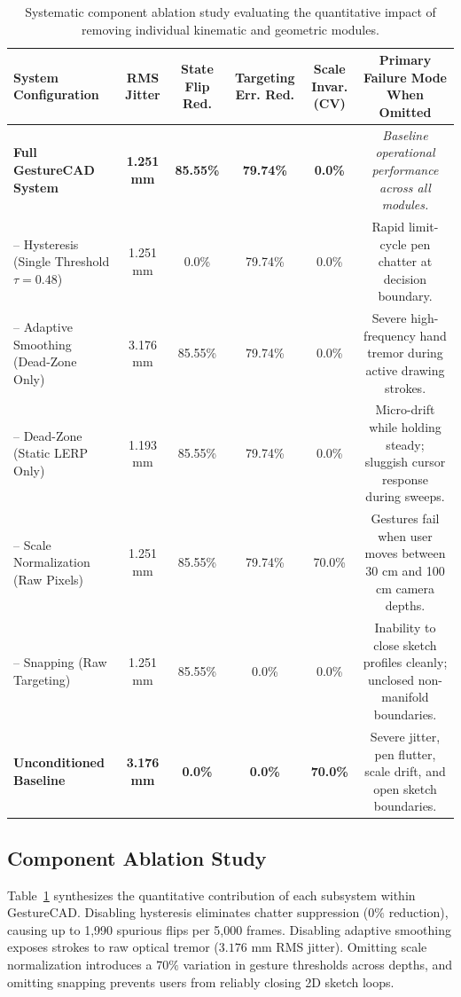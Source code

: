 \begin{table}[t]
\caption{Systematic component ablation study evaluating the quantitative impact of removing individual kinematic and geometric modules.}
\label{tab:ablation}
\centering
\small
\begin{tabular}{lccccc}
\toprule
\textbf{System Configuration} & \textbf{RMS Jitter} & \textbf{State Flip Red.} & \textbf{Targeting Err. Red.} & \textbf{Scale Invar. (CV)} & \textbf{Primary Failure Mode When Omitted} \\
\midrule
\textbf{Full GestureCAD System} & \textbf{1.251 mm} & \textbf{85.55\%} & \textbf{79.74\%} & \textbf{0.0\%} & \textit{Baseline operational performance across all modules.} \\
-- Hysteresis (Single Threshold $\tau=0.48$) & 1.251 mm & 0.0\% & 79.74\% & 0.0\% & Rapid limit-cycle pen chatter at decision boundary. \\
-- Adaptive Smoothing (Dead-Zone Only) & 3.176 mm & 85.55\% & 79.74\% & 0.0\% & Severe high-frequency hand tremor during active drawing strokes. \\
-- Dead-Zone (Static LERP Only) & 1.193 mm & 85.55\% & 79.74\% & 0.0\% & Micro-drift while holding steady; sluggish cursor response during sweeps. \\
-- Scale Normalization (Raw Pixels) & 1.251 mm & 85.55\% & 79.74\% & 70.0\% & Gestures fail when user moves between 30 cm and 100 cm camera depths. \\
-- Snapping (Raw Targeting) & 1.251 mm & 85.55\% & 0.0\% & 0.0\% & Inability to close sketch profiles cleanly; unclosed non-manifold boundaries. \\
\textbf{Unconditioned Baseline} & \textbf{3.176 mm} & \textbf{0.0\%} & \textbf{0.0\%} & \textbf{70.0\%} & Severe jitter, pen flutter, scale drift, and open sketch boundaries. \\
\bottomrule
\end{tabular}
\end{table}

\subsection{Component Ablation Study}
Table~\ref{tab:ablation} synthesizes the quantitative contribution of each subsystem within GestureCAD. Disabling hysteresis eliminates chatter suppression ($0\%$ reduction), causing up to 1,990 spurious flips per 5,000 frames. Disabling adaptive smoothing exposes strokes to raw optical tremor ($3.176\text{ mm}$ RMS jitter). Omitting scale normalization introduces a $70\%$ variation in gesture thresholds across depths, and omitting snapping prevents users from reliably closing 2D sketch loops.
